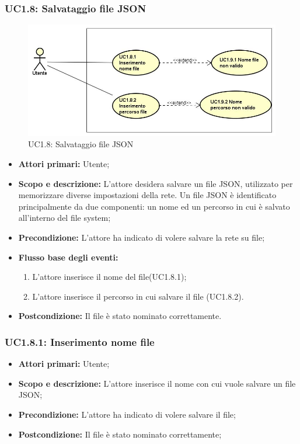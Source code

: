 \subsubsection{UC1.8: Salvataggio file JSON} 
\begin{figure} [H]
	\centering
	\includegraphics[scale=0.45]{Img/UC1-8} 
	\caption{UC1.8: Salvataggio file JSON} \label{} 
\end{figure} 
\begin{itemize} 
	\item{\textbf{Attori primari:} Utente;} 
	\item{\textbf{Scopo e descrizione:} L'attore desidera salvare un file JSON, utilizzato per memorizzare diverse impostazioni della rete. Un file JSON è identificato principalmente da due componenti: un nome ed un percorso in cui è salvato all'interno del file system;} 
	\item{\textbf{Precondizione:} L'attore ha indicato di volere salvare la rete su file;} 
	\item{\textbf{Flusso base degli eventi:} } 
	\begin{enumerate} 
		\item{L'attore inserisce il nome del file(UC1.8.1);} 
		\item{L'attore inserisce il percorso in cui salvare il file (UC1.8.2).} 
	\end{enumerate} 
	\item{\textbf{Postcondizione:} Il file è stato nominato correttamente.} 
\end{itemize} 
\subsubsection{UC1.8.1: Inserimento nome file} 
\begin{itemize} 
	\item{\textbf{Attori primari:} Utente;} 
	\item{\textbf{Scopo e descrizione:} L'attore inserisce il nome con cui vuole salvare un file JSON;} 
	\item{\textbf{Precondizione:} L'attore ha indicato di volere salvare il file;} 
	\item{\textbf{Postcondizione:} Il file è stato nominato correttamente;} 
\end{itemize} 
